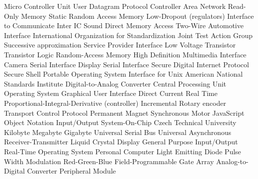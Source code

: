 				{Micro Controller Unit}
				{User Datagram Protocol}
				{Controller Area Network}
				{Read-Only Memory}
				{Static Random Access Memory}
				{Low-Dropout (regulators)}
				{Interface to Communicate}
				{Inter IC Sound}
				{Direct Memory Access}
				{Two-Wire Automotive Interface}
				{International Organization for Standardization}
				{Joint Test Action Group}
				{Successive approximation}
				{Service Provider Interface}
			{Low Voltage Transistor Transistor Logic}
				{Random-Access Memory}
				{High Definition Multimedia Interface}
				{Camera Serial Interface}
				{Display Serial Interface}
				{Secure Digital}
				{Internet Protocol}
				{Secure Shell}
			{Portable Operating System Interface for Unix}
				{American National Standards Institute}
				{Digital-to-Analog Converter}
				{Central Processing Unit}
				{Operating System}
				{Graphical User Interface}
				{Direct Current}
				{Real Time}
				{Proportional-Integral-Derivative (controller)}
				{Incremental Rotary encoder}
				{Transport Control Protocol}
				{Permanent Magnet Synchronous Motor}
				{JavaScript Object Notation}
				{Input/Output}
				{System-On-Chip}
				{Czech Technical University}
				{Kilobyte}
				{Megabyte}
				{Gigabyte}
				{Universal Serial Bus}
				{Universal Asynchronous Receiver-Transmitter}
				{Liquid Crystal Display}
				{General Purpose Input/Output}
				{Real-Time Operating System}
				{Personal Computer}
				{Light Emitting Diode}
				{Pulse Width Modulation}
				{Red-Green-Blue}
				{Field-Programmable Gate Array}
				{Analog-to-Digital Converter}
				{Peripheral Module}